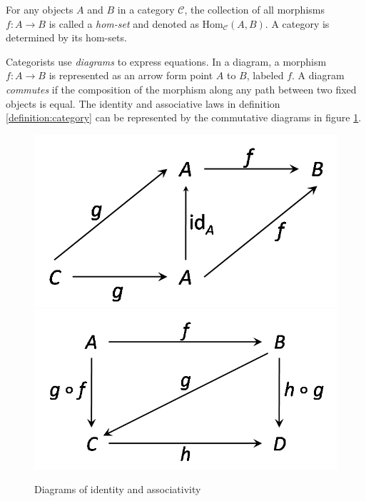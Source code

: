 For any objects $ A $ and $ B $ in a category $ \mathcal{C} $, the collection of all morphisms $ f: A \to B $ is called a \emph{hom-set} and denoted as $ \text{Hom}_\mathcal{C}(A,B) $. A category is determined by its hom-sets.

Categorists use \emph{diagrams} to express equations. In a diagram, a morphism $ f: A \to B $ is represented as an arrow form point $ A $ to $ B $, labeled $ f $. A diagram \emph{commutes} if the composition of the morphism along any path between two fixed objects is equal. The identity and associative laws in definition \ref{definition:category} can be represented by the commutative diagrams in figure \ref{figure:cat_id_asso}.
\begin{figure}[h!]
\centering
\includegraphics[scale=0.42]{./images/cat_id}
\includegraphics[scale=0.42]{./images/cat_asso}
\caption{Diagrams of identity and associativity}
\label{figure:cat_id_asso}
\end{figure}

